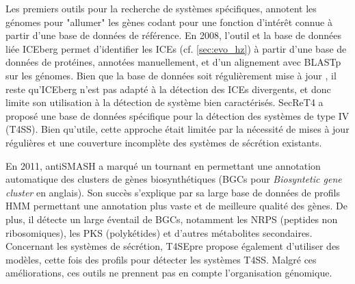 Les premiers outils pour la recherche de systèmes spécifiques, annotent les génomes pour "allumer" les gènes codant pour une fonction d'intérêt connue à partir d'une base de données de référence. En 2008, l'outil et la base de données liée ICEberg \cite{bi_iceberg_2012} permet d'identifier les ICEs (cf. \autoref{sec:evo_hz}) à partir d'une base de données de protéines, annotées manuellement, et d'un alignement avec BLASTp sur les génomes. Bien que la base de données soit régulièrement mise à jour \cite{wang_iceberg_2024}, il reste qu'ICEberg n'est pas adapté à la détection des ICEs divergents, et donc limite son utilisation à la détection de système bien caractérisés. SecReT4 \cite{bi_secret4_2013} a proposé une base de données spécifique pour la détection des systèmes de type IV (T4SS). Bien qu’utile, cette approche était limitée par la nécessité de mises à jour régulières et une couverture incomplète des systèmes de sécrétion existants.

En 2011, antiSMASH \cite{medema_antismash_2011} a marqué un tournant en permettant une annotation automatique des clusters de gènes biosynthétiques (BGCs pour \textit{Biosyntetic gene cluster} en anglais). Son succès s’explique par sa large base de données de profils HMM permettant une annotation plus vaste et de meilleure qualité des gènes. De plus, il détecte un large éventail de BGCs, notamment les NRPS (peptides non ribosomiques), les PKS (polykétides) et d’autres métabolites secondaires. Concernant les systèmes de sécrétion, T4SEpre \cite{wang_prediction_2014} propose également d'utiliser des modèles, cette fois des profils pour détecter les systèmes T4SS. Malgré ces améliorations, ces outils ne prennent pas en compte l'organisation génomique.

